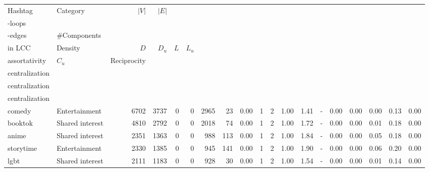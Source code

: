 \begin{tabular}{llrrrrrrrrrrrrrrrrr}
\toprule
         Hashtag &        Category &  $|V|$ &  $|E|$ &  \makecell{\#Self\\ -loops} &  \makecell{\#Multi\\ -edges} &  \#Components &  \makecell{$|V|$\\ in LCC} &  Density &  $D$ &  $D_u$ &  $L$ &  $L_u$ &  \makecell{Degree\\ assortativity} &  $C_u$ &  Reciprocity &  \makecell{Degree\\ centralization} &  \makecell{Closeness\\ centralization} &  \makecell{Betweenness\\ centralization} \\
\midrule
          comedy &   Entertainment &   6702 &   3737 &                           0 &                            0 &          2965 &                         23 &     0.00 &    1 &      2 & 1.00 &   1.41 &                                - &   0.00 &         0.00 &                                0.00 &                                   0.13 &                                     0.00 \\
         booktok & Shared interest &   4810 &   2792 &                           0 &                            0 &          2018 &                         74 &     0.00 &    1 &      2 & 1.00 &   1.72 &                                - &   0.00 &         0.00 &                                0.01 &                                   0.18 &                                     0.00 \\
           anime & Shared interest &   2351 &   1363 &                           0 &                            0 &           988 &                        113 &     0.00 &    1 &      2 & 1.00 &   1.84 &                                - &   0.00 &         0.00 &                                0.05 &                                   0.18 &                                     0.00 \\
       storytime &   Entertainment &   2330 &   1385 &                           0 &                            0 &           945 &                        141 &     0.00 &    1 &      2 & 1.00 &   1.90 &                                - &   0.00 &         0.00 &                                0.06 &                                   0.20 &                                     0.00 \\
            lgbt & Shared interest &   2111 &   1183 &                           0 &                            0 &           928 &                         30 &     0.00 &    1 &      2 & 1.00 &   1.54 &                                - &   0.00 &         0.00 &                                0.01 &                                   0.14 &                                     0.00 \\

\end{tabular}
